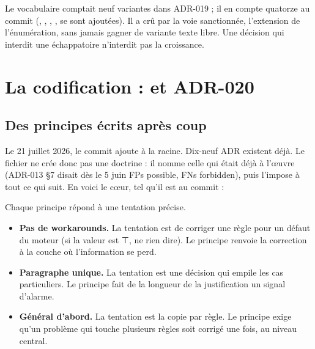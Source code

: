 \begin{remarque}
Le vocabulaire  comptait neuf variantes dans ADR-019 ; il en compte quatorze au commit  (, , , ,  se sont ajoutées). Il a crû par la voie sanctionnée, l'extension de l'énumération, sans jamais gagner de variante texte libre. Une décision qui interdit une échappatoire n'interdit pas la croissance.
\end{remarque}

\section{La codification : \texorpdfstring{}{CLAUDE.md} et ADR-020}
\label{sec:histoire-doctrine-codification}

\subsection{Des principes écrits après coup}

Le 21 juillet 2026, le commit  ajoute  à la racine. Dix-neuf ADR existent déjà. Le fichier ne crée donc pas une doctrine : il nomme celle qui était déjà à l'œuvre (ADR-013 §7 disait dès le 5 juin \og FPs possible, FNs forbidden\fg{}), puis l'impose à tout ce qui suit. En voici le cœur, tel qu'il est au commit  :



Chaque principe répond à une tentation précise.
\begin{itemize}
  \item \textbf{Pas de workarounds.} La tentation est de corriger une règle pour un défaut du moteur (\og si la valeur est ⊤, ne rien dire\fg{}). Le principe renvoie la correction à la couche où l'information se perd.
  \item \textbf{Paragraphe unique.} La tentation est une décision qui empile les cas particuliers. Le principe fait de la longueur de la justification un signal d'alarme.
  \item \textbf{Général d'abord.} La tentation est la copie par règle. Le principe exige qu'un problème qui touche plusieurs règles soit corrigé une fois, au niveau central.
\end{itemize}

